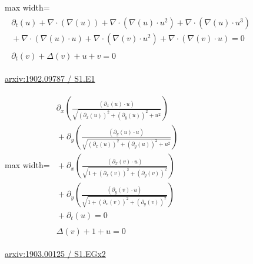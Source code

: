 \documentclass[UTF8,10pt,a4paper,fontset=mac]{ctexart}
\begin{document}
\begin{minipage}{\linewidth}\begin{center}\begin{adjustbox}{max width=\linewidth}$\displaystyle\begin{gathered}\begin{gathered}\partial_{t}(u)+\nabla\cdot(\nabla(u))+\nabla\cdot(\nabla(u)\cdot u^{2})+\nabla\cdot(\nabla(u)\cdot u^{3})\\[-1pt]{}+\nabla\cdot(\nabla(u)\cdot u)+\nabla\cdot(\nabla(v)\cdot u^{2})+\nabla\cdot(\nabla(v)\cdot u)=0\end{gathered}\\[5pt]\begin{gathered}\partial_{t}(v)+\Delta(v)+u+v=0\end{gathered}\end{gathered}$\end{adjustbox}\end{center}{\small\href{https://arxiv.org/html/1902.09787#S1.E1}{arxiv:1902.09787 / S1.E1}}\par\end{minipage}\par\vspace{6mm}

\begin{minipage}{\linewidth}\begin{center}\begin{adjustbox}{max width=\linewidth}$\displaystyle\begin{gathered}\begin{gathered}\partial_{x}(\frac{(\partial_{x}(u)\cdot u)}{\sqrt{(\partial_{x}(u))^{2}+(\partial_{y}(u))^{2}+u^{2}}})\\[-1pt]{}+\partial_{y}(\frac{(\partial_{y}(u)\cdot u)}{\sqrt{(\partial_{x}(u))^{2}+(\partial_{y}(u))^{2}+u^{2}}})\\[-1pt]{}+\partial_{x}(\frac{(\partial_{x}(v)\cdot u)}{\sqrt{1+(\partial_{x}(v))^{2}+(\partial_{y}(v))^{2}}})\\[-1pt]{}+\partial_{y}(\frac{(\partial_{y}(v)\cdot u)}{\sqrt{1+(\partial_{x}(v))^{2}+(\partial_{y}(v))^{2}}})\\[-1pt]{}+\partial_{t}(u)=0\end{gathered}\\[5pt]\begin{gathered}\Delta(v)+1+u=0\end{gathered}\end{gathered}$\end{adjustbox}\end{center}{\small\href{https://arxiv.org/html/1903.00125#S1.EGx2}{arxiv:1903.00125 / S1.EGx2}}\par\end{minipage}\par\vspace{6mm}
\end{document}
